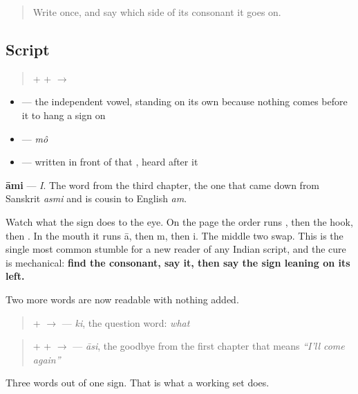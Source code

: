 \label{lesson:BN-W02-ami-read}



\begin{quote}
Write \textbf{} once, and say which side of its consonant it goes on.
\end{quote}

\subsection*{Script}
\begin{quote}
\textbf{} + \textbf{} + \textbf{} $\to$ \textbf{}
\end{quote}

\begin{itemize}
\raggedright
  \item \textbf{} — the independent vowel, standing on its own because nothing comes before it to hang a sign on
  \item \textbf{} — \emph{mô}
  \item \textbf{} — written in front of that \textbf{}, heard after it
\end{itemize}

\textbf{āmi} — \emph{I}. The word from the third chapter, the one that came down from Sanskrit \emph{asmi} and is cousin to English \emph{am}.

Watch what the sign does to the eye. On the page the order runs , then the hook, then . In the mouth it runs ā, then m, then i. The middle two swap. This is the single most common stumble for a new reader of any Indian script, and the cure is mechanical: \textbf{find the consonant, say it, then say the sign leaning on its left.}

Two more words are now readable with nothing added.

\begin{quote}
\textbf{} + \textbf{} $\to$ \textbf{} — \emph{ki}, the question word: \emph{what}
\end{quote}

\begin{quote}
\textbf{} + \textbf{} + \textbf{} $\to$ \textbf{} — \emph{āsi}, the goodbye from the first chapter that means \emph{\textquotedblleft{}I'll come again\textquotedblright{}}
\end{quote}

Three words out of one sign. That is what a working set does.

